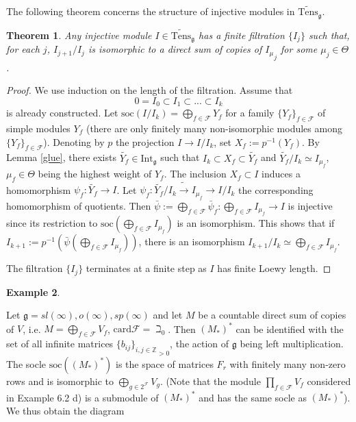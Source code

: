 \documentclass{birkmult}
\newcounter{theorem}
\newtheorem{theo}{Theorem}[section]
\newtheorem{example}[theo]{Example}
\renewcommand{\gg}{\mathfrak{g}}
\newcommand{\Int}{\mathrm{Int}}
\newcommand{\lind}{\widetilde{\mathrm{Tens}}}
\newcommand{\soc}{\mathrm{soc}}
\begin{document}
The following theorem concerns the structure of injective modules in $\lind_\gg$.
\begin{theo}\label{injfil}
Any injective module $I\in\lind_\gg$ has a finite filtration $\{I_j\}$ such
that, for each $j$, $I_{j+1}/I_j$ is isomorphic to a direct sum of copies of
${I_{\mu}}_j$ for some $\mu_j\in\Theta$.
\end{theo}
\begin{proof}
We use induction on the length of the filtration. Assume that
$$0=I_0\subset I_1\subset ...\subset I_k$$ 
is already constructed. Let $\soc(I/I_k)=\bigoplus_{f\in\mathcal
F}Y_f$ for a family $\{Y_f\}_{f\in\mathcal F}$ of simple modules $Y_f$ (there are
only finitely many non-isomorphic modules among $\{Y_f\}_{f\in\mathcal F}$).
Denoting by $p$ the projection $I\rightarrow I/I_k$, set
$X_f:=p^{-1}(Y_f)$. By Lemma \ref{glue}, there exists $\tilde{Y_f}\in\Int_\gg$
such that $I_k\subset X_f\subset\tilde{Y_f}$ and $\tilde{Y_f}/I_k\simeq I_{\mu_f}$,
$\mu_f\in\Theta$ being the highest weight of $Y_f$. The inclusion $X_f\subset I$
induces a homomorphism $\psi_f:\tilde{Y_f}\rightarrow I$. Let
$\psi_f:\tilde{Y_f}/I_k\tilde{\rightarrow}I_{\mu_f}\rightarrow I/I_k$
the corresponding homomorphism of quotients. Then
$\bar\psi :=\bigoplus_{f\in\mathcal F}\bar\psi_f:\bigoplus_{f\in\mathcal F}I_{\mu_f}\rightarrow I$
is injective since its restriction to $\soc(\bigoplus_{f\in\mathcal F}I_{\mu_f})$
is an isomorphism. This shows that if $I_{k+1}:=p^{-1}(\bar\psi(\bigoplus_{f\in\mathcal F}I_{\mu_f}))$,
there is an isomorphism $I_{k+1}/I_k\simeq\bigoplus_{f\in\mathcal F}I_{\mu_f}$.

The filtration $\{I_j\}$ terminates at a finite step as $I$ has finite Loewy length.
\end{proof}
\begin{example}\end{example}
Let $\gg=sl(\infty),o(\infty),sp(\infty)$ and let $M$ be a countable
direct sum of copies of $V$, i.e. $M=\bigoplus_{f\in\mathcal F}V_f$,
$\mathrm{card} \mathcal F = \beth_0$. Then $(M_*)^*$ can be identified
with the set of all infinite matrices ${\{b_{ij}\}_{i,j\in\mathbb{Z}}}_{>0}$,
the action of $\gg$ being left multiplication. The socle $\soc((M_*)^*)$
is the space of matrices $F_r$ with finitely many non-zero rows and is
isomorphic to $\bigoplus_{g\in 2^{\mathcal F}}V_g$. (Note that the
module $\prod_{f\in\mathcal F}V_f$ considered in Example 6.2 d) is a
submodule of $(M_*)^*$ and has the same socle as $(M_*)^*$). We thus obtain
the diagram 
\end{document}

